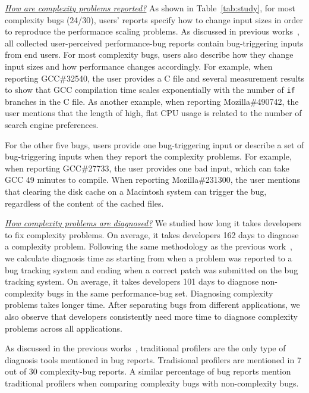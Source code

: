 {\underline{\textit{How are complexity problems reported?}}
As shown in Table~\ref{tab:study},
for most complexity bugs (24/30), 
users' reports specify how to change input sizes 
in order to reproduce the performance scaling problems. 
As discussed in previous works~\cite{SongOOPSLA2014}, 
all collected user-perceived performance-bug reports
contain bug-triggering inputs from end users. 
For most complexity bugs, 
users also describe how they change input sizes 
and how performance changes accordingly. 
For example, when reporting GCC\#32540, 
the user provides a C file and several measurement results to 
show that GCC compilation time scales exponentially 
with the number of \texttt{if} branches in the C file. 
As another example, when reporting Mozilla\#490742, 
the user mentions that the length of high, 
flat CPU usage is related to the number of search engine preferences. 


For the other five bugs, users provide one bug-triggering input 
or describe a set of bug-triggering inputs when they report the complexity problems. 
For example, when reporting GCC\#27733, 
the user provides one bad input, which can take GCC 49 minutes to compile. 
When reporting Mozilla\#231300, the user mentions 
that clearing the disk cache on a Macintosh system can trigger the bug, 
regardless of the content of the cached files. 


{\underline{\textit{How complexity problems are diagnosed?}}
We studied how long it takes developers to fix complexity problems. 
On average, it takes developers 162 days to diagnose a complexity problem. 
Following the same methodology as the previous work~\cite{SongOOPSLA2014},
we calculate diagnosis time as starting from when a problem 
was reported to a bug tracking system
and ending when a correct patch was submitted on the bug tracking system. 
On average, it takes developers 101 days to diagnose non-complexity bugs in the same performance-bug set. 
Diagnosing complexity problems takes longer time.
After separating bugs from different applications, 
we also observe that developers consistently need more time to diagnose complexity problems across all applications.

As discussed in the previous works~\cite{SongOOPSLA2014}, 
traditional profilers are the only type of diagnosis tools mentioned in bug reports. 
Tradisional profilers are mentioned in 7 out of 30 complexity-bug reports. 
A similar percentage of bug reports mention traditional profilers
when comparing complexity bugs with non-complexity bugs. 

}}
